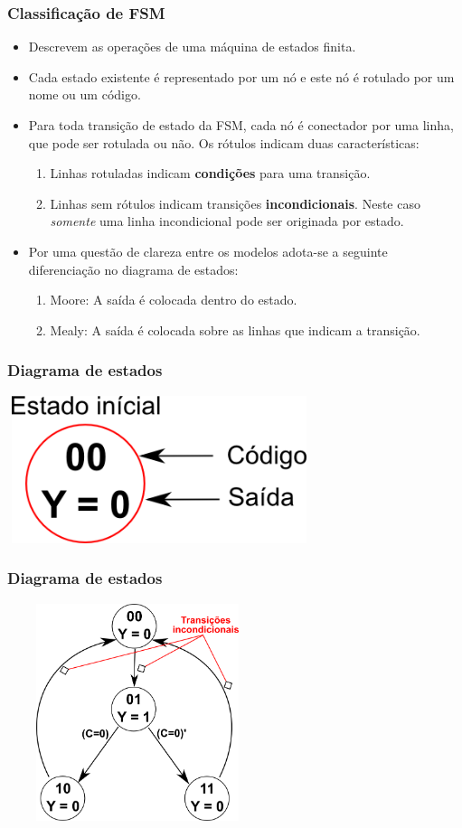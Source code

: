 \documentclass{beamer}
\begin{document}
\begin{frame}
  \frametitle{Classificação de FSM}
  \begin{itemize}
    \item Descrevem as operações de uma máquina de estados finita.\pause
    \item Cada estado existente é representado por um nó e este nó é rotulado por um nome ou um código.\pause
    \item Para toda transição de estado da FSM, cada nó é conectador por uma linha, que pode ser rotulada ou não. Os rótulos indicam duas características:\pause
    \begin{enumerate}
     \item Linhas rotuladas indicam \textbf{condições} para uma transição.\pause
     \item Linhas sem rótulos indicam transições \textbf{incondicionais}. Neste caso \textit{somente} uma linha incondicional pode ser originada por estado.\pause
    \end{enumerate}
    \item Por uma questão de clareza entre os modelos adota-se a seguinte diferenciação no diagrama de estados:\pause
    \begin{enumerate}
     \item Moore: A saída é colocada dentro do estado.\pause
     \item Mealy: A saída é colocada sobre as linhas que indicam a transição.
    \end{enumerate}
  \end{itemize}
\end{frame}

\begin{frame}
  \frametitle{Diagrama de estados}
    \includegraphics[height = 1.7in, width = 3.5in]{mealyvsmoore.png}
\end{frame}

\begin{frame}
  \frametitle{Diagrama de estados}
    \includegraphics[height = 2.5in, width = 3in]{mealyvsmoore_2.png}
\end{frame}
\end{document}
